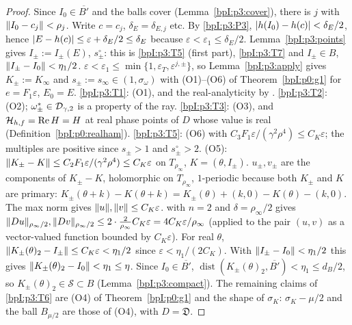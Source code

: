\begin{proof}
\label{stepI:p3:tori-patch}
Since $I_0\in\overline{B'}$ and the balls cover (Lemma~\ref{bpI:p3:cover}), there is $j$ with $\lVert I_0-c_j\rVert<\rho_j$. Write $c=c_j$, $\delta_E=\delta_{E,j}$ etc. By \ref{bpI:p3:P3}, $\lvert h(I_0)-h(c)\rvert<\delta_E/2$, hence
$\lvert E-h(c)\rvert\le\varepsilon+\delta_E/2\le\delta_E$ because $\varepsilon<\varepsilon_1\le\delta_E/2$.
\label{stepI:p3:tori-base}
Lemma~\ref{bpI:p3:points} gives $I_\pm:=I_\pm(E)$, $s^\circ_\pm$: this is \ref{bpI:p3:T5} (first part), \ref{bpI:p3:T7} and $I_\pm\in B$, $\lVert I_\pm-I_0\rVert<\eta_1/2$.
\label{stepI:p3:tori-ig1}
$\varepsilon<\varepsilon_1\le\min\{1,\varepsilon_T,\varepsilon^{j,\pm}\}$, so Lemma~\ref{bpI:p3:apply} gives $K_\pm:=K_\infty$ and $s_\pm:=s_\infty\in(1,\sigma_\omega)$ with (O1)--(O6) of Theorem~\ref{bpI:p0:g1} for $e=F_1\varepsilon$, $E_0=E$.
\ref{bpI:p3:T1}: (O1), and the real-analyticity by . \ref{bpI:p3:T2}: (O2); $\omega^*_\pm\in\mathcal{D}_{\gamma,2}$ is a property of the ray. \ref{bpI:p3:T3}: (O3), and $\mathcal H_{h,f}=\operatorname{Re}H=H$ at real phase points of $D$ whose value is real
(Definition~\ref{bpI:p0:realham}). \ref{bpI:p3:T5}: (O6) with $C_3F_1\varepsilon/(\gamma^2\rho^4)\le C_K\varepsilon$; the multiples are positive since $s_\pm>1$ and $s^\circ_\pm>2$.
\label{stepI:p3:tori-close}
(O5): $\lVert K_\pm-K\rVert\le C_2F_1\varepsilon/(\gamma^2\rho^4)\le C_K\varepsilon$ on $T_{\rho_\infty}$, $K=(\theta,I_\pm)$. $u_\pm,v_\pm$ are the components of $K_\pm-K$, holomorphic on $T_{\rho_\infty}$, $1$-periodic because both $K_\pm$ and $K$ are primary: $K_\pm(\theta+k)-K(\theta+k)=K_\pm(\theta)+(k,0)-K(\theta)-(k,0)$.
The max norm gives $\lVert u\rVert,\lVert v\rVert\le C_K\varepsilon$.  with $n=2$ and $\delta=\rho_\infty/2$ gives $\lVert Du\rVert_{\rho_\infty/2},\lVert Dv\rVert_{\rho_\infty/2}\le2\cdot\frac{2}{\rho_\infty}C_K\varepsilon=4C_K\varepsilon/\rho_\infty$ (applied to the pair $(u,v)$ as a vector-valued function bounded by $C_K\varepsilon$).
\label{stepI:p3:tori-position}
For real $\theta$, $\lVert K_\pm(\theta)_2-I_\pm\rVert\le C_K\varepsilon<\eta_1/2$ since $\varepsilon<\eta_1/(2C_K)$. With $\lVert I_\pm-I_0\rVert<\eta_1/2$ this gives $\lVert K_\pm(\theta)_2-I_0\rVert<\eta_1\le\eta$.
Since $I_0\in\overline{B'}$, $\operatorname{dist}(K_\pm(\theta)_2,\overline{B'})<\eta_1\le d_B/2$, so $K_\pm(\theta)_2\in\mathcal S\subset B$ (Lemma~\ref{bpI:p3:compact}). The remaining claims of \ref{bpI:p3:T6} are (O4) of Theorem~\ref{bpI:p0:g1}
and the shape of $\sigma_K$: $\sigma_K-\mu/2$ and the ball $B_{\mu/2}$ are those of (O4), with $D=\mathfrak D$.
\end{proof}

